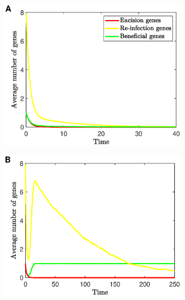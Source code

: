  \begin{figure}[hbt!]
    \centering
     \begin{subfigure}[t]{0.50\textwidth} 
    \includegraphics[scale=0.50]{trivSim1}
     \end{subfigure}\hfill
         \begin{subfigure}[t]{0.50\textwidth}
    \includegraphics[scale=0.50]{E_bSim1}
    \end{subfigure}\hfill\\  \begin{subfigure}[t]{0.50\textwidth}

\end{subfigure}
\end{figure}
